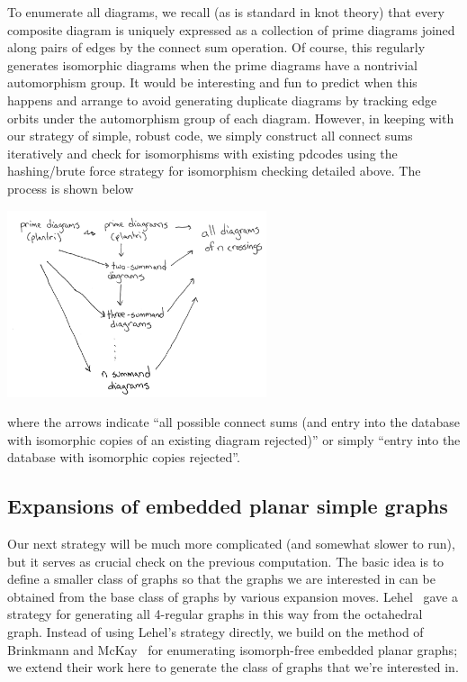 \documentclass[amsmath,secnumarabic,floatfix,amssymb,nofootinbib,nobibnotes,letterpaper,11pt,tightenlines,showkeys]{revtex4}
\theoremstyle{definition}
\begin{document}
To enumerate all diagrams, we recall (as is standard in knot theory) that every composite diagram is uniquely expressed as a collection of prime diagrams joined along pairs of edges by the connect sum operation. Of course, this regularly generates isomorphic diagrams when the prime diagrams have a nontrivial automorphism group. It would be interesting and fun to predict when this happens and arrange to avoid generating duplicate diagrams by tracking edge orbits under the automorphism group of each diagram. However, in keeping with our strategy of simple, robust code, we simply construct all connect sums iteratively and check for isomorphisms with existing pdcodes using the hashing/brute force strategy for isomorphism checking detailed above. The process is shown below

\begin{center}
\includegraphics[width=3in]{composite-workflow}
\end{center}

where the arrows indicate ``all possible connect sums (and entry into the database with isomorphic copies of an existing diagram rejected)'' or simply ``entry into the database with isomorphic copies rejected''.

\subsection{Expansions of embedded planar simple graphs}

Our next strategy will be much more complicated (and somewhat slower to run), but it serves as crucial check on the previous computation. The basic idea is to define a smaller class of graphs so that the graphs we are interested in can be obtained from the base class of graphs by various expansion moves. Lehel~\cite{JGT:JGT3190050412} gave a strategy for generating all 4-regular graphs in this way from the octahedral graph. Instead of using Lehel's strategy directly, we build on the method of Brinkmann and McKay~\cite{Brinkmann:2007up,McKay:1998wa} for enumerating isomorph-free embedded planar graphs; we extend their work here to generate the class of graphs that we're interested in.
\end{document}
